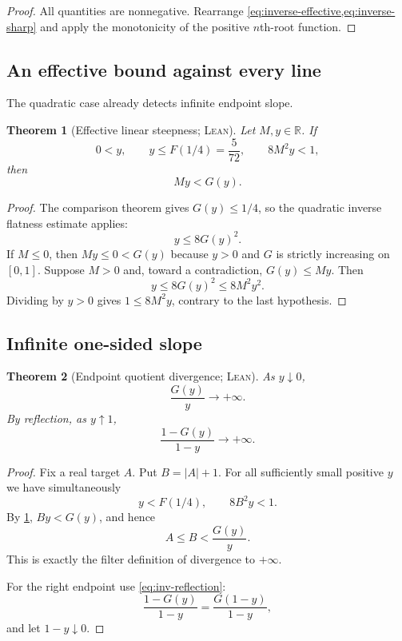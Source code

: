 \documentclass[11pt,oneside]{article}
\newtheorem{theorem}{Theorem}[section]
\theoremstyle{definition}
\theoremstyle{remark}
\newcommand{\R}{\mathbb R}
\newcommand{\InvF}{G}
\newcommand{\Formalized}{\textsc{Lean}}
\begin{document}
\begin{proof}
All quantities are nonnegative.  Rearrange
\cref{eq:inverse-effective,eq:inverse-sharp} and apply the monotonicity of
the positive $n$th-root function.
\end{proof}

\subsection{An effective bound against every line}

The quadratic case already detects infinite endpoint slope.

\begin{theorem}[Effective linear steepness; \Formalized]
\label{thm:effective-linear}
Let $M,y\in\R$.  If
\[
 0<y,\qquad y\leq F(1/4)=\frac5{72},\qquad
 8M^2y<1,
\]
then
\[
 My<\InvF(y).
\]
\end{theorem}

\begin{proof}
The comparison theorem gives $\InvF(y)\leq1/4$, so the quadratic inverse
flatness estimate applies:
\[
 y\leq8\InvF(y)^2. \label{eq:quadratic-inv}
\]
If $M\leq0$, then $My\leq0<\InvF(y)$ because $y>0$ and $\InvF$ is strictly
increasing on $[0,1]$.  Suppose $M>0$ and, toward a contradiction,
$\InvF(y)\leq My$.  Then
\[
 y\leq8\InvF(y)^2\leq8M^2y^2.
\]
Dividing by $y>0$ gives $1\leq8M^2y$, contrary to the last hypothesis.
\end{proof}

\subsection{Infinite one-sided slope}

\begin{theorem}[Endpoint quotient divergence; \Formalized]
\label{thm:inverse-quotient}
As $y\downarrow0$,
\[
 \frac{\InvF(y)}{y}\longrightarrow+\infty.
\]
By reflection, as $y\uparrow1$,
\[
 \frac{1-\InvF(y)}{1-y}\longrightarrow+\infty.
\]
\end{theorem}

\begin{proof}
Fix a real target $A$.  Put $B=|A|+1$.  For all sufficiently small
positive $y$ we have simultaneously
\[
 y<F(1/4),\qquad 8B^2y<1.
\]
By \cref{thm:effective-linear}, $By<\InvF(y)$, and hence
\[
 A\leq B<\frac{\InvF(y)}y.
\]
This is exactly the filter definition of divergence to $+\infty$.

For the right endpoint use \eqref{eq:inv-reflection}:
\[
 \frac{1-\InvF(y)}{1-y}
 =\frac{\InvF(1-y)}{1-y},
\]
and let $1-y\downarrow0$.
\end{proof}
\end{document}
